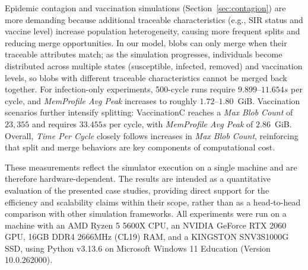 \documentclass[pdflatex,sn-mathphys-num]{sn-jnl}%
\theoremstyle{thmstyleone}%
\theoremstyle{thmstyletwo}%
\theoremstyle{thmstylethree}%
\begin{document}
{Epidemic contagion and vaccination simulations (Section~\ref{sec:contagion}) are more demanding because additional traceable characteristics (e.g., SIR status and vaccine level) increase population heterogeneity, causing more frequent splits and reducing merge opportunities. In our model, blobs can only merge when their traceable attributes match; as the simulation progresses, individuals become distributed across multiple states (susceptible, infected, removed) and vaccination levels, so blobs with different traceable characteristics cannot be merged back together.
For infection-only experiments, 500-cycle runs require $9.899$--$11.654s$ per cycle, and \textit{MemProfile Avg Peak} increases to roughly $1.72$--$1.80$~GiB. Vaccination scenarios further intensify splitting: VaccinationC reaches a \textit{Max Blob Count} of $23,355$ and requires $33.455s$ per cycle, with \textit{MemProfile Avg Peak} of $2.86$~GiB. Overall, \textit{Time Per Cycle} closely follows increases in \textit{Max Blob Count}, reinforcing that split and merge behaviors are key components of computational cost.

These measurements reflect the simulator execution on a single machine and are therefore hardware-dependent. The results are intended as a quantitative evaluation of the presented case studies, providing direct support for the efficiency and scalability claims within their scope, rather than as a head-to-head comparison with other simulation frameworks. 
All experiments were run on a machine with an AMD Ryzen 5 5600X CPU, an NVIDIA GeForce RTX 2060 GPU, 16GB DDR4 2666MHz (CL19) RAM, and a KINGSTON SNV3S1000G SSD, using Python v3.13.6 on Microsoft Windows 11 Education (Version 10.0.262000).}
\end{document}
